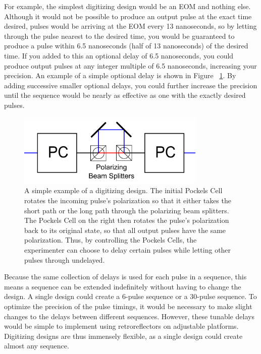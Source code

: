 \documentclass[pdftex,12pt,a4paper]{article}
\begin{document}
For example, the simplest digitizing design would be an EOM and nothing else. Although it would not be possible to produce an output pulse at the exact time desired, pulses would be arriving at the EOM every 13 nanoseconds, so by letting through the pulse nearest to the desired time, you would be guaranteed to produce a pulse within 6.5 nanoseconds (half of 13 nanoseconds) of the desired time. If you added to this an optional delay of 6.5 nanoseconds, you could produce output pulses at any integer multiple of 6.5 nanoseconds, increasing your precision. An example of a simple optional delay is shown in Figure ~\ref{fig:simple}. By adding successive smaller optional delays, you could further increase the precision until the sequence would be nearly as effective as one with the exactly desired pulses.
    
 \begin{figure}[t]
\centering
\includegraphics[width=0.8\textwidth]{simple_digitizing.png}
\caption{A simple example of a digitizing design. The initial Pockels Cell rotates the incoming pulse's polarization so that it either takes the short path or the long path through the polarizing beam splitters. The Pockels Cell on the right then rotates the pulse's polarization back to its original state, so that all output pulses have the same polarization. Thus, by controlling the Pockels Cells, the experimenter can choose to delay certain pulses while letting other pulses through undelayed.}
\label{fig:simple}
\end{figure}
    
Because the same collection of delays is used for each pulse in a sequence, this means a sequence can be extended indefinitely without having to change the design. A single design could create a 6-pulse sequence or a 30-pulse sequence. To optimize the precision of the pulse timings, it would be necessary to make slight changes to the delays between different sequences. However, these tunable delays would be simple to implement using retroreflectors on adjustable platforms. Digitizing designs are thus immensely flexible, as a single design could create almost any sequence. 
    
\end{document}
